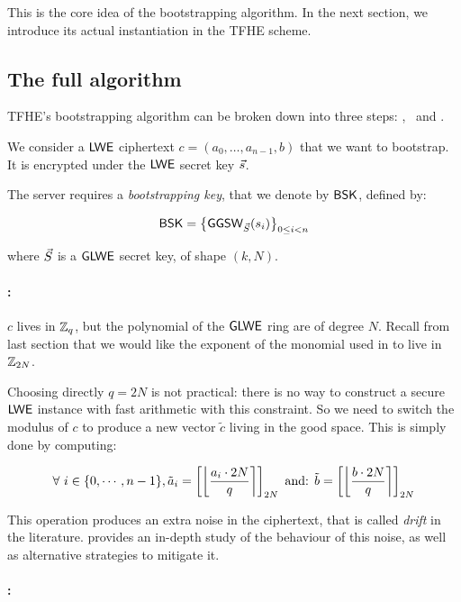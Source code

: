 This is the core idea of the bootstrapping algorithm. In the next section, we introduce its actual instantiation in the TFHE scheme.

\subsection{The full algorithm}

TFHE's bootstrapping algorithm can be broken down into three steps: \ModSwitch, \BlindRotate~and \SampleExtract.

We consider a $\textsf{LWE}$ ciphertext $c = (a_0, \dots, a_{n-1}, b)$ that we want to bootstrap. It is encrypted under the $\textsf{LWE}$ secret key $\vec s$. 

The server requires a \textit{bootstrapping key}, that we denote by $\textsf{BSK}$, defined by:

\[
	\textsf{BSK} = \left \lbrace \textsf{GGSW}_{\vec S}(s_i) \right \rbrace_{0 \le i < n}
\]

where $\vec S$ is a $\textsf{GLWE}$ secret key, of shape $(k, N)$.


\paragraph{\ModSwitch:}

$c$ lives in $\mathbb{Z}_q$, but the polynomial of the $\textsf{GLWE}$ ring are of degree $N$. Recall from last section that we would like the exponent of the monomial used in \BlindRotate to live in $\mathbb{Z}_{2N}$.

Choosing directly $q = 2N$ is not practical: there is no way to construct a secure $\textsf{LWE}$ instance with fast arithmetic with this constraint. So we need to switch the modulus of $c$ to produce a new vector $\tilde c$ living in the good space. This is simply done by computing:

\[
	\forall~i \in \{0, \cdots, n-1\}, \tilde a_i = \left [ \left \lfloor \frac{a_i \cdot 2N}{q} \right \rceil \right ]_{2N} \text{ and: } \tilde b = \left [ \left \lfloor \frac{b \cdot 2N}{q} \right \rceil \right ]_{2N}
\]


This operation produces an extra noise in the ciphertext, that is called \textit{drift} in the literature. \cite{joye_drift} provides an in-depth study of the behaviour of this noise, as well as alternative strategies to mitigate it.


\paragraph{\BlindRotate:}

